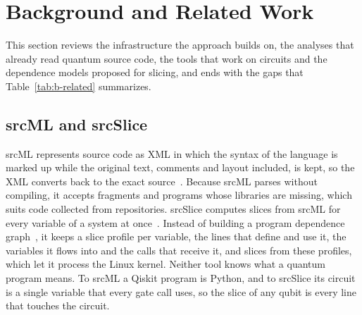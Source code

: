 \section{Background and Related Work}\label{sec:b-related}

This section reviews the infrastructure the approach builds on, the analyses that already read quantum source code,
the tools that work on circuits and the dependence models proposed for slicing, and ends with the gaps that
Table~\ref{tab:b-related} summarizes.

\subsection{srcML and srcSlice}
srcML represents source code as XML in which the syntax of the language is marked up while the original text, comments
and layout included, is kept, so the XML converts back to the exact source~\cite{collard2011lightweight,
collard2013srcml}. Because srcML parses without compiling, it accepts fragments and programs whose libraries are
missing, which suits code collected from repositories. srcSlice computes slices from srcML for every variable of a
system at once~\cite{alomari2014srcslice}. Instead of building a program dependence graph~\cite{ferrante1987pdg,
horwitz1990interprocedural}, it keeps a slice profile per variable, the lines that define and use it, the variables it
flows into and the calls that receive it, and slices from these profiles, which let it process the Linux kernel.
Neither tool knows what a quantum program means. To srcML a Qiskit program is Python, and to srcSlice its circuit is a
single variable that every gate call uses, so the slice of any qubit is every line that touches the circuit.


